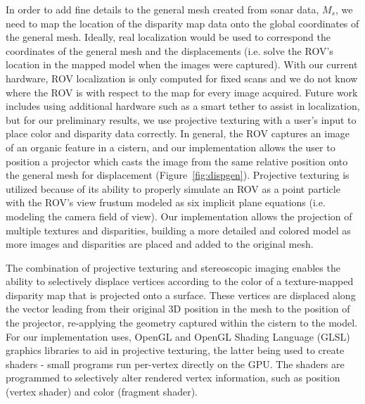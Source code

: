 \documentclass[a4paper,twoside]{article}
\begin{document}
\noindent In order to add fine details to the general mesh created from sonar data, $M_s$, we need to map the location of the disparity map data onto the global coordinates of the general mesh. Ideally, real localization would be used to correspond the coordinates of the general mesh and the displacements (i.e. solve the ROV's location in the mapped model when the images were captured).  With our current hardware, ROV localization is only computed for fixed scans and we do not know where the ROV is with respect to the map for every image acquired. Future work includes using additional hardware such as a smart tether to assist in localization, but for our preliminary results, we use projective texturing with a user's input to place color and disparity data correctly. In general, the ROV captures an image of an organic feature in a cistern, and our implementation allows the user to position a projector which casts the image from the same relative position onto the general mesh for displacement (Figure~\ref{fig:dispgen}). Projective texturing is  utilized because of its ability to properly simulate an ROV as a point particle with the ROV's view frustum modeled as six implicit plane equations (i.e. modeling the camera field of view). Our implementation allows the projection of multiple textures and disparities, building a more detailed and colored model as more images and disparities are placed and added to the original mesh.

The combination of projective texturing and stereoscopic imaging enables the ability to selectively displace vertices according to the color of a texture-mapped disparity map that is projected onto a surface. These vertices are displaced along the vector leading from their original 3D position in the mesh to the position of the projector, re-applying the geometry captured within the cistern to the model.  For our implementation uses, OpenGL and OpenGL Shading Language (GLSL) graphics libraries to aid in projective texturing, the latter being used to create shaders - small programs run per-vertex directly on the GPU. The shaders are programmed to selectively alter rendered vertex information, such as position (vertex shader) and color (fragment shader). 
\end{document}
